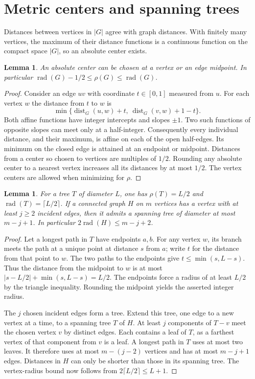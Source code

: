 \documentclass[11pt,a4paper]{article}
\newtheorem{lemma}[theorem]{Lemma}
\newcommand{\rad}{\operatorname{rad}}
\newcommand{\dist}{\operatorname{dist}}
\begin{document}
\section{Metric centers and spanning trees}\label{sec:metric}
Distances between vertices in $|G|$ agree with graph distances. With
finitely many vertices, the maximum of their distance functions is a
continuous function on the compact space $|G|$, so an absolute center
exists.
\begin{lemma}\label{lem:half}
An absolute center can be chosen at a vertex or an edge midpoint.
In particular $\rad(G)-1/2\le\rho(G)\le\rad(G)$.
\end{lemma}
\begin{proof}
Consider an edge $uv$ with coordinate $t\in[0,1]$ measured from $u$.
For each vertex $w$ the distance from $t$ to $w$ is
\[
 \min\{\dist_G(u,w)+t,\ \dist_G(v,w)+1-t\}.
\]
Both affine functions have integer intercepts and slopes $\pm1$. Two
such functions of opposite slopes can meet only at a half-integer.
Consequently every individual distance, and their maximum, is affine
on each of the open half-edges. Its minimum on the closed edge is
attained at an endpoint or midpoint. Distances from a center so chosen
to vertices are multiples of $1/2$. Rounding any absolute center to a
nearest vertex increases all its distances by at most $1/2$. The vertex
centers are allowed when minimizing for $\rho$.
\end{proof}
\begin{lemma}\label{lem:tree}
For a tree $T$ of diameter $L$, one has $\rho(T)=L/2$ and
$\rad(T)=\lceil L/2\rceil$. If a connected graph $H$ on $m$ vertices
has a vertex with at least $j\ge2$ incident edges, then it admits a
spanning tree of diameter at most $m-j+1$. In particular
$2\rad(H)\le m-j+2$.
\end{lemma}
\begin{proof}
Let a longest path in $T$ have endpoints $a,b$. For any vertex $w$, its
branch meets the path at a unique point at distance $s$ from $a$; write
$t$ for the distance from that point to $w$. The two paths to the
endpoints give $t\le\min(s,L-s)$. Thus the distance from the midpoint
to $w$ is at most $|s-L/2|+\min(s,L-s)=L/2$. The endpoints force a
radius of at least $L/2$ by the triangle inequality. Rounding the
midpoint yields the asserted integer radius.

The $j$ chosen incident edges form a tree. Extend this tree, one edge
to a new vertex at a time, to a spanning tree $T$ of $H$. At least $j$
components of $T-v$ meet the chosen vertex $v$ by distinct edges.
Each contains a leaf of $T$, as a farthest vertex of that component
from $v$ is a leaf. A longest path in $T$ uses at most two leaves. It
therefore uses at most $m-(j-2)$ vertices and has at most $m-j+1$ edges.
Distances in $H$ can only be shorter than those in its spanning tree.
The vertex-radius bound now follows from $2\lceil L/2\rceil\le L+1$.
\end{proof}
\end{document}
